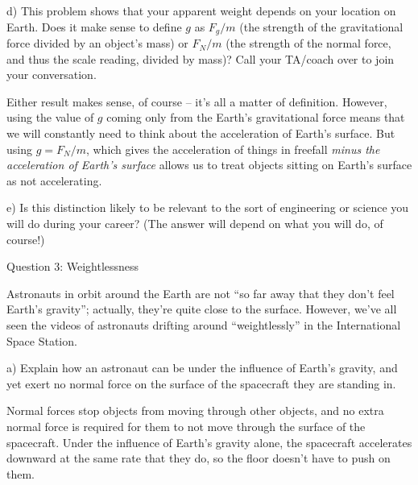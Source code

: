 \documentclass[12pt]{article}
\begin{document}
d) This problem shows that your apparent weight depends on your location on Earth. 
Does it make sense to define $g$ as $F_g/m$ 
(the strength of the gravitational force divided by an object's mass) or
$F_N/m$ (the strength of the normal force, and thus the scale reading, divided by mass)? Call your TA/coach over to join your conversation.

{\color{Red}
	
	Either result makes sense, of course -- it's all a matter of definition. However, using the value of $g$ coming only from the Earth's gravitational force means that we will constantly need to think about the acceleration of Earth's surface. But using $g = F_N/m$, which gives the acceleration of things in freefall {\it minus the acceleration of Earth's surface} allows us to treat objects sitting on Earth's surface as not accelerating.
}


e) Is this distinction likely to be relevant to the sort of engineering or science you will do during your
career? (The answer will depend on what you will do, of course!)


%
%
%
%
%
%
%
%
%
%
%
\newpage
\centerline{\Large Question 3: Weightlessness}

Astronauts in orbit around the Earth are not ``so far away that they don't feel Earth's gravity'';
actually, they’re quite close to the surface. However, we’ve all seen the videos of astronauts drifting
around ``weightlessly'' in the International Space Station.

a) Explain how an astronaut can be under the influence of Earth's gravity, and yet exert no normal
force on the surface of the spacecraft they are standing in.

{\color{Red}Normal forces stop objects from moving through other objects, and no extra normal force is required for them to not move through the surface of the spacecraft. Under the influence of Earth's gravity alone, the spacecraft accelerates downward at the same rate that they do, so the floor doesn't have to push on them.}
\end{document}
